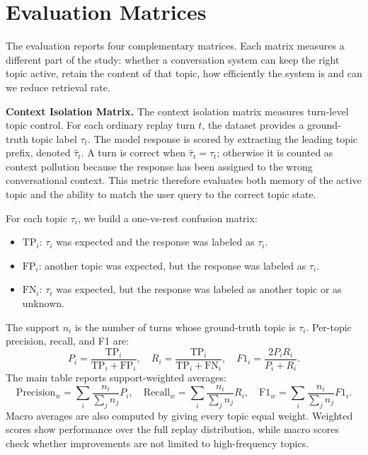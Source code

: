 \section{Evaluation Matrices}\label{subsubsec:metrics}

The evaluation reports four complementary matrices. Each matrix measures a different part of the study: whether a conversation system can keep the right topic active, retain the content of that topic, how  efficiently the system is and can we reduce retrieval rate.

\textbf{Context Isolation Matrix.}
The context isolation matrix measures turn-level topic control. For each ordinary replay turn $t$, the dataset provides a ground-truth topic label $\tau_t$. The model response is scored by extracting the leading topic prefix, denoted $\hat{\tau}_t$. A turn is correct when $\hat{\tau}_t=\tau_t$; otherwise it is counted as context pollution because the response has been assigned to the wrong conversational context. This metric therefore evaluates both memory of the active topic and the ability to match the user query to the correct topic state.

For each topic $\tau_i$, we build a one-vs-rest confusion matrix:
\begin{itemize}
    \item $\text{TP}_i$: $\tau_i$ was expected and the response was labeled as $\tau_i$.
    \item $\text{FP}_i$: another topic was expected, but the response was labeled as $\tau_i$.
    \item $\text{FN}_i$: $\tau_i$ was expected, but the response was labeled as another topic or as unknown.
\end{itemize}
The support $n_i$ is the number of turns whose ground-truth topic is $\tau_i$. Per-topic precision, recall, and F1 are:
\begin{equation}
P_i = \frac{\text{TP}_i}{\text{TP}_i + \text{FP}_i}, \quad
R_i = \frac{\text{TP}_i}{\text{TP}_i + \text{FN}_i}, \quad
F1_i = \frac{2P_iR_i}{P_i + R_i}.
\label{eq:per_topic_metrics}
\end{equation}
The main table reports support-weighted averages:
\begin{equation}
\text{Precision}_w = \sum_i \frac{n_i}{\sum_j n_j} P_i, \quad
\text{Recall}_w = \sum_i \frac{n_i}{\sum_j n_j} R_i, \quad
\text{F1}_w = \sum_i \frac{n_i}{\sum_j n_j} F1_i.
\label{eq:weighted_isolation}
\end{equation}
Macro averages are also computed by giving every topic equal weight. Weighted scores show performance over the full replay distribution, while macro scores check whether improvements are not limited to high-frequency topics.


